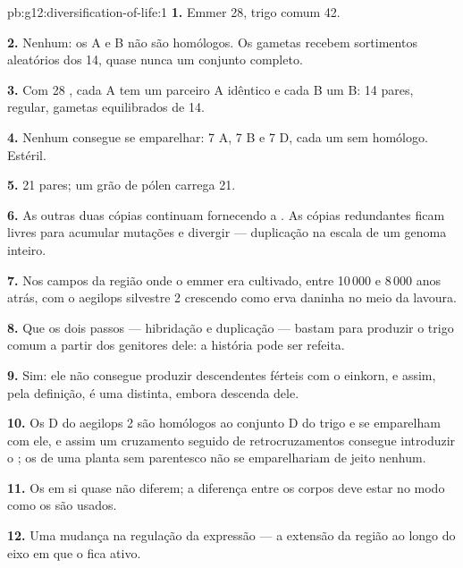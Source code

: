 \begin{solution}{pb:g12:diversification-of-life:1}
\textbf{1.} Emmer 28, trigo comum 42.

\textbf{2.} Nenhum: os  A e B não são homólogos. Os gametas
recebem sortimentos aleatórios dos 14, quase nunca um conjunto completo.

\textbf{3.} Com 28 , cada A tem um parceiro A idêntico e
cada B um B: 14 pares,  regular, gametas equilibrados de 14.

\textbf{4.} Nenhum consegue se emparelhar: 7  A, 7 B e 7 D,
cada um sem homólogo. Estéril.

\textbf{5.} 21 pares; um grão de pólen carrega 21.

\textbf{6.} As outras duas cópias continuam fornecendo a . As
cópias redundantes ficam livres para acumular mutações e divergir ---
duplicação na escala de um genoma inteiro.

\textbf{7.} Nos campos da região onde o emmer era cultivado, entre
10\,000 e 8\,000 anos atrás, com o aegilops silvestre 2 crescendo como
erva daninha no meio da lavoura.

\textbf{8.} Que os dois passos --- hibridação e duplicação --- bastam
para produzir o trigo comum a partir dos genitores dele: a história
pode ser refeita.

\textbf{9.} Sim: ele não consegue produzir descendentes férteis com o
einkorn, e assim, pela definição, é uma  distinta, embora
descenda dele.

\textbf{10.} Os  D do aegilops 2 são homólogos ao conjunto D
do trigo e se emparelham com ele, e assim um cruzamento seguido de
retrocruzamentos consegue introduzir o ; os  de uma
planta sem parentesco não se emparelhariam de jeito nenhum.

\textbf{11.} Os  em si quase não diferem; a diferença entre os
corpos deve estar no modo como os  são usados.

\textbf{12.} Uma mudança na regulação da expressão --- a extensão da
região ao longo do eixo em que o  fica ativo.


\end{solution}
